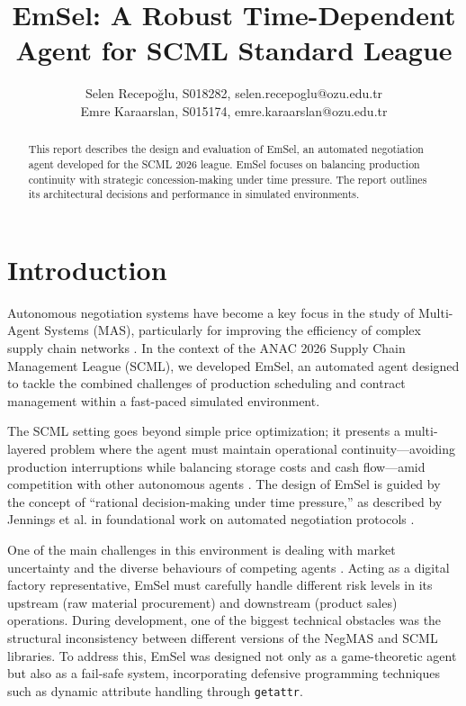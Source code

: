 \documentclass[a4paper,11pt]{article}
\title{EmSel: A Robust Time-Dependent Agent for SCML Standard League}
\author{Selen Recepoğlu, S018282, selen.recepoglu@ozu.edu.tr \\ 
	Emre Karaarslan, S015174, emre.karaarslan@ozu.edu.tr}
\date{} %
\begin{document}
	
	\maketitle
	
	\begin{abstract}
		This report describes the design and evaluation of EmSel, an automated negotiation agent developed for the SCML 2026 league. EmSel focuses on balancing production continuity with strategic concession-making under time pressure. The report outlines its architectural decisions and performance in simulated environments.
	\end{abstract}
	
	\section{Introduction}
	Autonomous negotiation systems have become a key focus in the study of Multi-Agent Systems (MAS), particularly for improving the efficiency of complex supply chain networks \cite{ref1}. In the context of the ANAC 2026 Supply Chain Management League (SCML), we developed EmSel, an automated agent designed to tackle the combined challenges of production scheduling and contract management within a fast-paced simulated environment. 
	
	The SCML setting goes beyond simple price optimization; it presents a multi-layered problem where the agent must maintain operational continuity—avoiding production interruptions while balancing storage costs and cash flow—amid competition with other autonomous agents \cite{ref2}. The design of EmSel is guided by the concept of ``rational decision-making under time pressure,'' as described by Jennings et al. in foundational work on automated negotiation protocols \cite{ref3}. 
	
	One of the main challenges in this environment is dealing with market uncertainty and the diverse behaviours of competing agents \cite{ref4}. Acting as a digital factory representative, EmSel must carefully handle different risk levels in its upstream (raw material procurement) and downstream (product sales) operations. During development, one of the biggest technical obstacles was the structural inconsistency between different versions of the NegMAS and SCML libraries. To address this, EmSel was designed not only as a game-theoretic agent but also as a fail-safe system, incorporating defensive programming techniques such as dynamic attribute handling through \texttt{getattr}.
	
\end{document}
